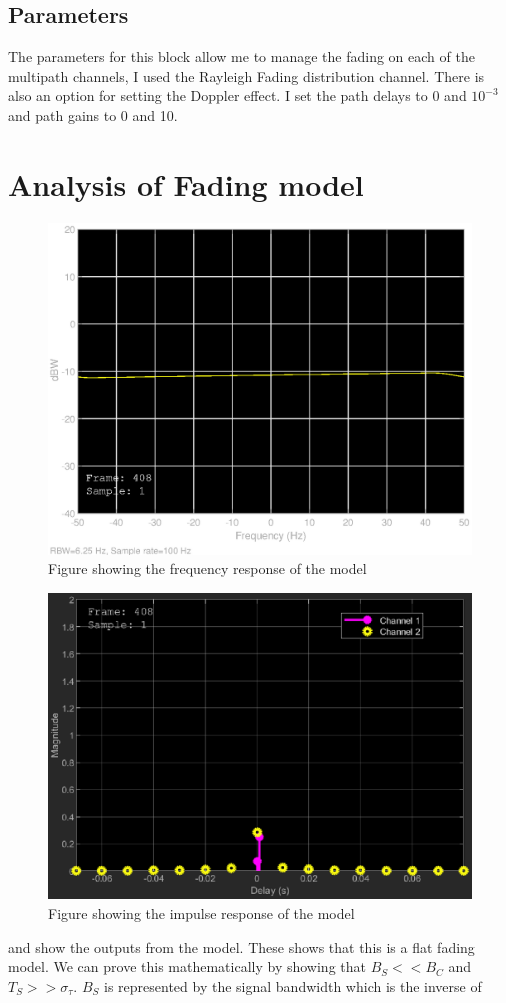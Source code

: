 \documentclass[a4paper,12pt]{scrartcl}
\begin{document}
{{		\subsection{Parameters}
		{
			The parameters for this block allow me to manage the fading on each of the multipath channels, I used the Rayleigh Fading distribution channel. There is also an option for setting the Doppler effect. I set the path delays to 0 and $10^{-3}$ and path gains to 0 and 10. 
		}
	}
	\section{Analysis of Fading model}{
		\begin{figure}
			\centering
			\includegraphics[width=\textwidth]{FrequencyResponse}
			\caption{Figure showing the frequency response of the model}
			\label{fig:FreqResponse}
		\end{figure}
		\begin{figure}
			\centering
			\includegraphics[width=\textwidth]{ImpulseResponse}
			\caption{Figure showing the impulse response of the model}
			\label{fig:ImplResponse}
		\end{figure}
		 and  show the outputs from the model. These shows that this is a flat fading model. We can prove this mathematically by showing that $B_S << B_C$ and $T_S >> \sigma_\tau$. $B_S$ is represented by the signal bandwidth which is the inverse of
	}
}
\end{document}
